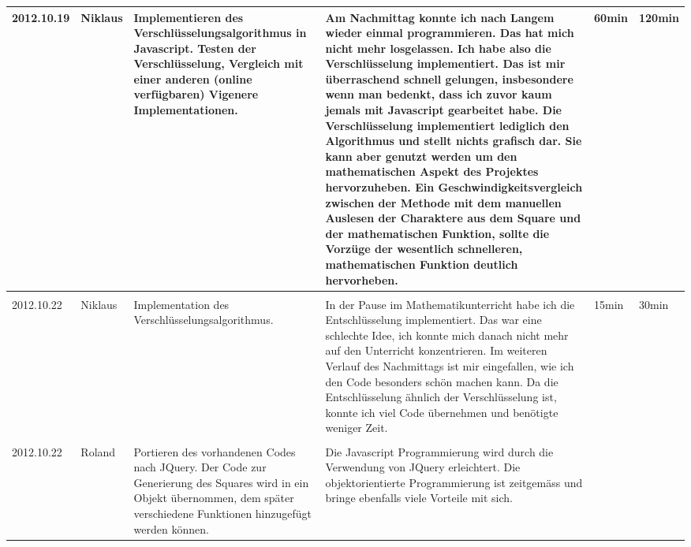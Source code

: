 \documentclass[11pt,paper=a4,final]{scrartcl}
\begin{document}
\begin{landscape}
\begin{longtable}{|p{1.8cm}|p{1.5cm}|p{5.0cm}|p{11.0cm}|l|l|}
    \hline
    2012.10.19 & Niklaus &
    Implementieren des Verschl\"usselungsalgorithmus in Javascript. Testen der Verschl\"usselung, Vergleich mit einer anderen (online verf\"ugbaren) Vigenere Implementationen.&
    Am Nachmittag konnte ich nach Langem wieder einmal programmieren. Das hat mich nicht mehr losgelassen. Ich habe also die Verschl\"usselung implementiert. Das ist mir \"uberraschend schnell gelungen, insbesondere wenn man bedenkt, dass ich zuvor kaum jemals mit Javascript gearbeitet habe. Die Verschl\"usselung implementiert lediglich den Algorithmus und stellt nichts grafisch dar. Sie kann aber genutzt werden um den mathematischen Aspekt des Projektes hervorzuheben. Ein Geschwindigkeitsvergleich zwischen der Methode mit dem manuellen Auslesen der Charaktere aus dem Square und der mathematischen Funktion, sollte die Vorz\"uge der wesentlich schnelleren, mathematischen Funktion deutlich hervorheben.&
    60min & 120min \\ \hline \nopagebreak
    \multicolumn{2}{|l|}{\bf Pendenzen} &\multicolumn{2}{p{16.0cm}|}{}  & \multicolumn{2}{l|}{} \\ \hline
    2012.10.22 & Niklaus &
    Implementation des Verschl\"usselungsalgorithmus.&
    In der Pause im Mathematikunterricht habe ich die Entschl\"usselung implementiert. Das war eine schlechte Idee, ich konnte mich danach nicht mehr auf den Unterricht konzentrieren. Im weiteren Verlauf des Nachmittags ist mir eingefallen, wie ich den Code besonders sch\"on machen kann. Da die Entschl\"usselung \"ahnlich der Verschl\"usselung ist, konnte ich viel Code \"ubernehmen und ben\"otigte weniger Zeit.&
    15min & 30min \\ \hline \nopagebreak
    \multicolumn{2}{|l|}{\bf Pendenzen} &\multicolumn{2}{p{16.0cm}|}{}  & \multicolumn{2}{l|}{} \\ \hline
    \hline
    2012.10.22 & Roland &
    Portieren des vorhandenen Codes nach JQuery. Der Code zur Generierung des Squares wird in ein Objekt \"ubernommen, dem sp\"ater verschiedene Funktionen hinzugef\"ugt werden k\"onnen.&
    Die Javascript Programmierung wird durch die Verwendung von JQuery erleichtert. Die objektorientierte Programmierung ist zeitgem\"ass und bringe ebenfalls viele Vorteile mit sich.&

\end{longtable}
\end{landscape}
\end{document}
